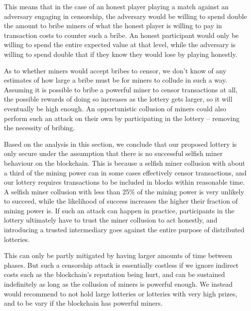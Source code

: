 This means that in the case of an honest player playing a match against an adversary engaging in censorship, the adversary would be willing to spend double the amount to bribe miners of what the honest player is willing to pay in transaction costs to counter such a bribe. An honest participant would only be willing to spend the entire expected value at that level, while the adversary is willing to spend double that if they know they would lose by playing honestly.

As to whether miners would accept bribes to censor, we don't know of any estimates of how large a bribe must be for miners to collude in such a way. Assuming it is possible to bribe a powerful miner to censor transactions at all, the possible rewards of doing so increases as the lottery gets larger, so it will eventually be high enough. An opportunistic collusion of miners could also perform such an attack on their own by participating in the lottery – removing the necessity of bribing.

Based on the analysis in this section, we conclude that our proposed lottery is only secure under the assumption that there is no successful selfish miner behaviour on the blockchain. This is because a selfish miner collusion with about a third of the mining power can in some cases effectively censor transactions, and our lottery requires transactions to be included in blocks within reasonable time. A selfish miner collusion with less than 25\% of the mining power is very unlikely to succeed, while the likelihood of success increases the higher their fraction of mining power is. If such an attack can happen in practice, participants in the lottery ultimately have to trust the miner collusion to act honestly, and introducing a trusted intermediary goes against the entire purpose of distributed lotteries. 

This can only be partly mitigated by having larger amounts of time between phases. But such a censorship attack is essentially costless if we ignore indirect costs such as the blockchain's reputation being hurt, and can be sustained indefinitely as long as the collusion of miners is powerful enough. We instead would recommend to not hold large lotteries or lotteries with very high prizes, and to be vary if the blockchain has powerful miners.
